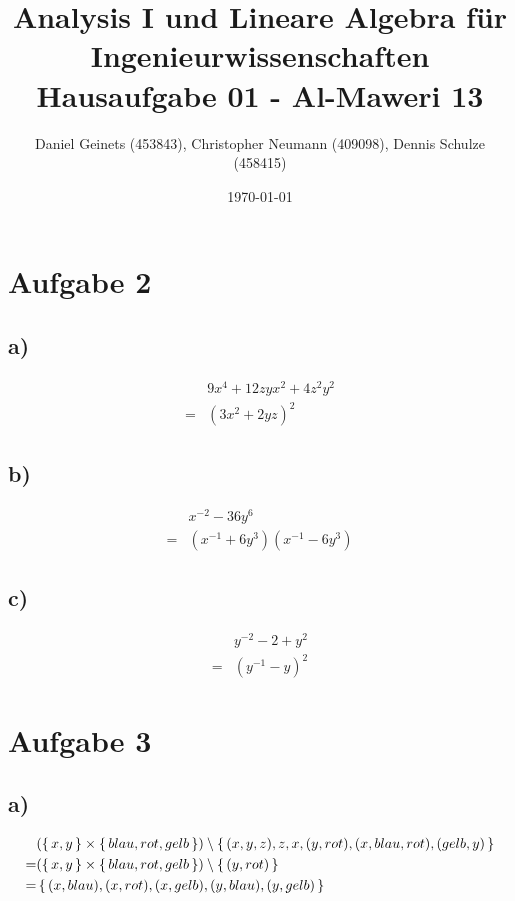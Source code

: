 \documentclass[a4paper, 11pt]{article}
\author{Daniel Geinets (453843), Christopher Neumann (409098), Dennis Schulze (458415)}
\date{\today}
\title{Analysis I und Lineare Algebra für Ingenieurwissenschaften \large  \\ Hausaufgabe 01 - Al-Maweri 13}
\begin{document}
\maketitle
\tableofcontents

\setcounter{secnumdepth}{0}

\pagebreak

\section{Aufgabe 2}
\label{sec:orgbafe228}
\subsection{a)}
\label{sec:orgc9ca8e7}
\begin{align*}
    & 9x^4 + 12zyx^2 + 4z^2y^2 \\
    = & (3x^2 + 2yz)^2
\end{align*}

\subsection{b)}
\label{sec:org5e4db1b}
\begin{align*}
    & x^{-2} - 36y^6 \\
    = & (x^{-1} + 6y^3)(x^{-1} - 6y^3)
\end{align*}

\subsection{c)}
\label{sec:org4f2aeec}
\begin{align*}
    & y^{-2} - 2 + y^2 \\
    = & (y^{-1} - y)^2
\end{align*}

\section{Aufgabe 3}
\label{sec:org83c1b4e}
\subsection{a)}
\label{sec:org6a011db}
\begin{align*}
    & ( \set{x, y}  \times \set{blau, rot, gelb}) \setminus \set{(x, y, z), z, x, (y, rot), (x, blau, rot), (gelb, y)} \\
    =& (\set{x, y} \times \set{blau, rot, gelb}) \setminus \set{(y, rot)} \\
    =& \set{(x, blau), (x, rot), (x, gelb), (y, blau), (y, gelb)}
\end{align*}
\end{document}

